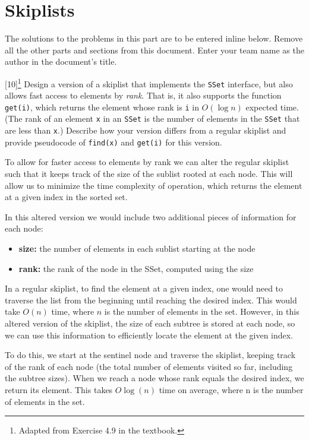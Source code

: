 \documentclass[addpoints]{exam}
\begin{document}
\newpage
\part{Skiplists}

The solutions to the problems in this part are to be entered inline below. Remove all the other parts and sections from this document. Enter your team name as the author in the document's title.

\begin{questions}

  [10]\footnote{Adapted from Exercise 4.9 in the textbook.}
  Design a version of a skiplist that implements the \texttt{SSet} interface, but also allows fast access to elements by \textit{rank}. That is, it also supports the function \texttt{get(i)}, which returns the element whose rank is \texttt{i} in $O(\log n)$ expected time. (The rank of an element \texttt{x} in an \texttt{SSet} is the number of elements in the \texttt{SSet} that are less than \texttt{x}.)
  Describe how your version differs from a regular skiplist and provide pseudocode of \texttt{find(x)} and \texttt{get(i)} for this version.
  \begin{solution}

    To allow for faster access to elements by rank we can alter the regular skiplist such that it keeps track of the size of the sublist rooted at each node. This will allow us to minimize the time complexity of  operation, which returns the element at a given index in the sorted set.

    In this altered version we would include two additional pieces of information for each node:
    \begin{itemize}
    \item \textbf{size:} the number of elements in each sublist starting at the node
    \item \textbf{rank:} the rank of the node in the SSet, computed using the size 
    \end{itemize}

    In a regular skiplist, to find the element at a given index, one would need to traverse the list from the beginning until reaching the desired index. This would take $O(n)$ time, where $n$ is the number of elements in the set. However, in this altered version of the skiplist, the size of each subtree is stored at each node, so we can use this information to efficiently locate the element at the given index.

    To do this, we start at the sentinel node and traverse the skiplist, keeping track of the rank of each node (the total number of elements visited so far, including the subtree sizes). When we reach a node whose rank equals the desired index, we return its element. This takes $O\log(n)$ time on average, where n is the number of elements in the set.


\end{solution}
\end{questions}
\end{document}
